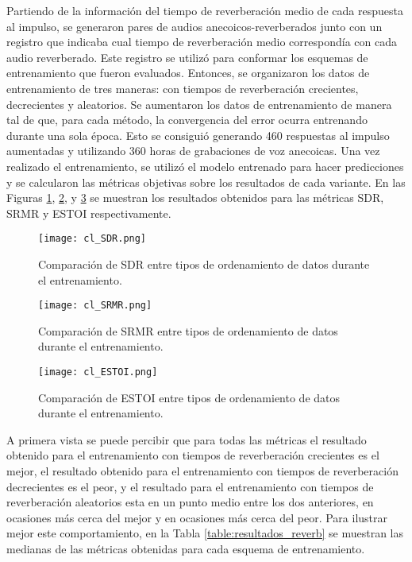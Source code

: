 Partiendo de la información del tiempo de reverberación medio de cada respuesta al impulso, se generaron pares de audios anecoicos-reverberados junto con un registro que indicaba cual tiempo de reverberación medio correspondía con cada audio reverberado. Este registro se utilizó para conformar los esquemas de entrenamiento que fueron evaluados. Entonces, se organizaron los datos de entrenamiento de tres maneras: con tiempos de reverberación crecientes, decrecientes y aleatorios. 
Se aumentaron los datos de entrenamiento de manera tal de que, para cada método, la convergencia del error ocurra entrenando durante una sola época. Esto se consiguió generando 460 respuestas al  impulso aumentadas y utilizando 360 horas de grabaciones de voz anecoicas. Una vez realizado el entrenamiento, se utilizó el modelo entrenado para hacer predicciones y se calcularon las métricas objetivas sobre los resultados de cada variante. En las Figuras \ref{fig:cl_sdr}, \ref{fig:cl_srmr}, y \ref{fig:cl_estoi} se muestran los resultados obtenidos para las métricas SDR, SRMR y ESTOI respectivamente. 

\begin{figure}[H]
	\centering{}
	\texttt{[image: cl\_SDR.png]}
	\caption{Comparación de SDR entre tipos de ordenamiento de datos durante el entrenamiento.}
	\label{fig:cl_sdr}
\end{figure}

\begin{figure}[H]
	\centering{}
	\texttt{[image: cl\_SRMR.png]}
	\caption{Comparación de SRMR entre tipos de ordenamiento de datos durante el entrenamiento.}
	\label{fig:cl_srmr}
\end{figure}

\begin{figure}[H]
	\centering{}
	\texttt{[image: cl\_ESTOI.png]}
	\caption{Comparación de ESTOI entre tipos de ordenamiento de datos durante el entrenamiento.}
	\label{fig:cl_estoi}
\end{figure}

A primera vista se puede percibir que para todas las métricas el resultado obtenido para el entrenamiento con tiempos de reverberación crecientes es el mejor, el resultado obtenido para el entrenamiento con tiempos de reverberación decrecientes es el peor, y el resultado para el entrenamiento con tiempos de reverberación aleatorios esta en un punto medio entre los dos anteriores, en ocasiones más cerca del mejor y en ocasiones más cerca del peor. Para ilustrar mejor este comportamiento, en la Tabla \ref{table:resultados_reverb} se muestran las medianas de las métricas obtenidas para cada esquema de entrenamiento. 

